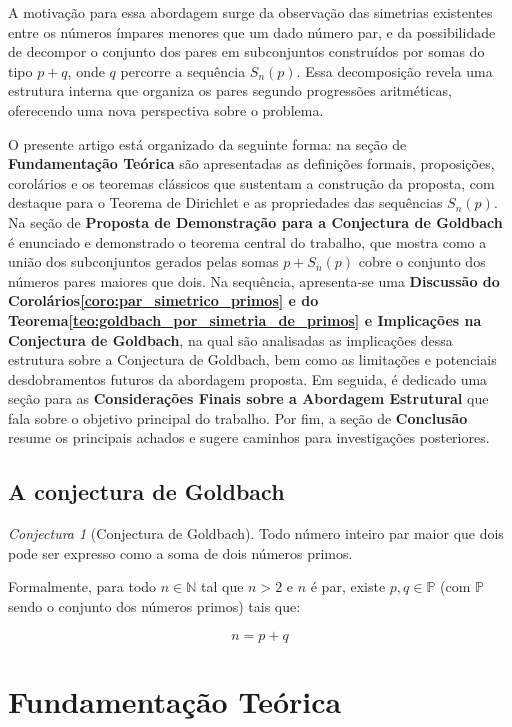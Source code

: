 \documentclass[a4paper,11pt]{article}
\theoremstyle{definition}
\theoremstyle{remark}
\newtheorem{conjecture}{Conjectura}
\begin{document}
\begin{otherlanguage}{brazil}
	A motivação para essa abordagem surge da observação das simetrias existentes entre os números ímpares menores que um dado número par, e da possibilidade de decompor o conjunto dos pares em subconjuntos construídos por somas do tipo \(p + q\), onde \(q\) percorre a sequência \(S_n(p)\). Essa decomposição revela uma estrutura interna que organiza os pares segundo progressões aritméticas, oferecendo uma nova perspectiva sobre o problema.
	
	O presente artigo está organizado da seguinte forma: na seção de \textbf{Fundamentação Teórica} são apresentadas as definições formais, proposições, corolários e os teoremas clássicos que sustentam a construção da proposta, com destaque para o Teorema de Dirichlet e as propriedades das sequências \(S_n(p)\). Na seção de \textbf{Proposta de Demonstração para a Conjectura de Goldbach} é enunciado e demonstrado o teorema central do trabalho, que mostra como a união dos subconjuntos gerados pelas somas \(p + S_n(p)\) cobre o conjunto dos números pares maiores que dois. Na sequência, apresenta-se uma \textbf{Discussão do Corolários\ref{coro:par_simetrico_primos} e do Teorema\ref{teo:goldbach_por_simetria_de_primos} e Implicações na Conjectura de Goldbach}, na qual são analisadas as implicações dessa estrutura sobre a Conjectura de Goldbach, bem como as limitações e potenciais desdobramentos futuros da abordagem proposta. Em seguida, é dedicado uma seção para as \textbf{Considerações Finais sobre a Abordagem Estrutural} que fala sobre o objetivo principal do trabalho. Por fim, a seção de \textbf{Conclusão} resume os principais achados e sugere caminhos para investigações posteriores.

	
	\subsection*{A conjectura de Goldbach}
	\begin{conjecture}[Conjectura de Goldbach]
		Todo número inteiro par maior que dois pode ser expresso como a soma de dois números primos.
		
		Formalmente, para todo \(n \in \mathbb{N}\) tal que \(n > 2\) e \(n\) é par, existe \(p, q \in \mathbb{P}\) (com \(\mathbb{P}\) sendo o conjunto dos números primos) tais que:
		
		\[
		n = p + q
		\]
		
	\end{conjecture}
	
	
	\section{Fundamentação Teórica}
	

\end{otherlanguage}
\end{document}
